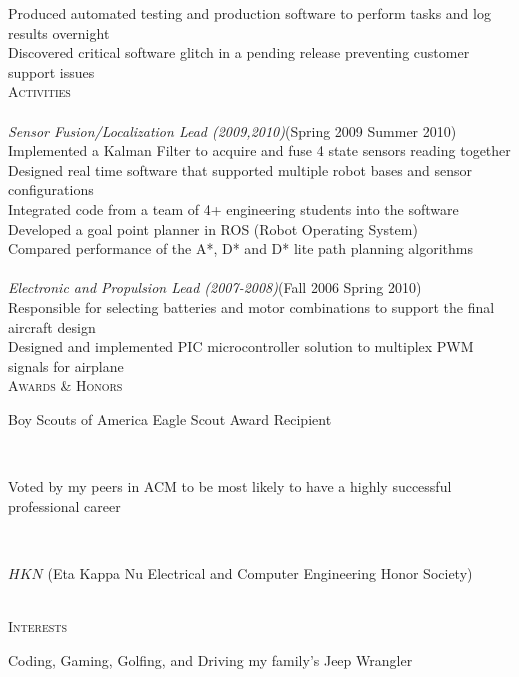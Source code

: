 \documentclass[11pt,letterpaper]{article}
\newcommand{\SectionHeader}[1]{\textsc{#1} \vspace{-2px}\\}
\newcommand{\CompanyHeader}[4]{\hspace*{.52in}{\bf#1} \hfill #2 \\\hspace*{.5in}\emph{#3}\hfill (#4) \\}
\newcommand{\ResumeItem}[1]{\hspace*{.5in}\textopenbullet\hspace*{.2in}#1\\}
\newcommand{\TextBlock}[1]
{\hspace*{.5in} \begin{minipage}[t]{\textwidth -.5in} #1 \end{minipage}\\}
\begin{document}
 \ResumeItem{Produced automated testing and production software to perform tasks and log results overnight} 
 \ResumeItem{Discovered critical software glitch in a pending release preventing customer support issues}
\SectionHeader{Activities}
\CompanyHeader{Intelligent Ground Vehicle Competition (IGVC)}{}{Sensor Fusion/Localization Lead (2009,2010)}{Spring 2009 \textendash { }Summer 2010}
 \ResumeItem{Implemented a Kalman Filter to acquire and fuse 4 state sensors reading together}
 \ResumeItem{Designed real time software that supported multiple  robot bases and sensor configurations}
 \ResumeItem{Integrated code from a team of 4+ engineering students into the software}
 \ResumeItem{Developed a goal point planner in ROS (Robot Operating System)}
 \ResumeItem{Compared performance of the A*, D* and D* lite path planning algorithms}
 \CompanyHeader{Design Build Fly/DBF}{}{Electronic and Propulsion Lead (2007-2008)}{Fall 2006 \textendash { }Spring 2010}
 \ResumeItem{Responsible for selecting batteries and motor combinations to support the final aircraft design}
\ResumeItem{Designed and implemented PIC microcontroller solution to multiplex PWM signals for airplane}
\SectionHeader{Awards \& Honors}
\TextBlock{Boy Scouts of America Eagle Scout Award Recipient}
\TextBlock{Voted by my peers in ACM to be most likely to have a highly successful professional career}
\TextBlock{$HKN$ (Eta Kappa Nu Electrical and Computer Engineering Honor Society)}
\SectionHeader{Interests}
\TextBlock{Coding, Gaming, Golfing, and Driving my family's Jeep Wrangler}
\end{document}
